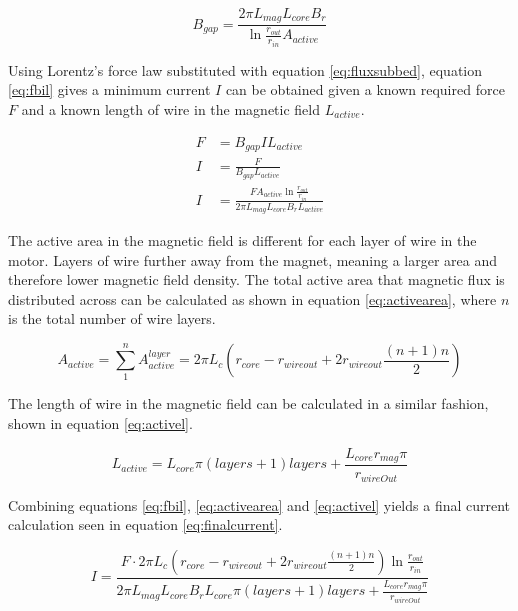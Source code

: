 \documentclass[a4paper,12pt]{article}
\begin{document}
\begin{equation}\label{eq:fluxsubbed}
    B_{gap} = \frac{2\pi L_{mag} L_{core} B_r}{\ln{\frac{r_{out}}{r_{in}}}A_{active}}
\end{equation}

Using Lorentz's force law substituted with equation \ref{eq:fluxsubbed}, equation \ref{eq:fbil} gives a minimum current $I$ can be obtained given a known required force $F$ and a known length of wire in the magnetic field $L_{active}$.

\begin{equation}\label{eq:fbil}
    \begin{split}
        F & = B_{gap}IL_{active}\\
        I & = \frac{F}{B_{gap}L_{active}}\\
        I & = \frac{F A_{active} \ln{\frac{r_{out}}{r_{in}}}}{2\pi L_{mag} L_{core} B_r L_{active}}
    \end{split}
\end{equation}

The active area in the magnetic field is different for each layer of wire in the motor. Layers of wire further away from the magnet, meaning a larger area and therefore lower magnetic field density. The total active area that magnetic flux is distributed across can be calculated as shown in equation \ref{eq:activearea}, where $n$ is the total number of wire layers.

\begin{equation}\label{eq:activearea}
    A_{active} = \sum_{1}^{n}{A_{active}^{layer}} = 2\pi L_c (r_{core}-r_{wireout} + 2r_{wireout} \frac{(n+1)n}{2})
\end{equation}

The length of wire in the magnetic field can be calculated in a similar fashion, shown in equation \ref{eq:activel}.

\begin{equation}\label{eq:activel}
    L_{active} = L_{core}\pi(layers+1)layers + \frac{L_{core} r_{mag} \pi}{r_{wireOut}}
\end{equation}

Combining equations \ref{eq:fbil}, \ref{eq:activearea} and \ref{eq:activel} yields a final current calculation seen in equation \ref{eq:finalcurrent}.

\begin{equation}\label{eq:finalcurrent}
    I = \frac{F\cdot 2\pi L_c (r_{core}-r_{wireout} + 2r_{wireout} \frac{(n+1)n}{2}) \ln{\frac{r_{out}}{r_{in}}}}{2\pi L_{mag} L_{core} B_r L_{core}\pi(layers+1)layers + \frac{L_{core} r_{mag} \pi}{r_{wireOut}}}
\end{equation}
\end{document}
